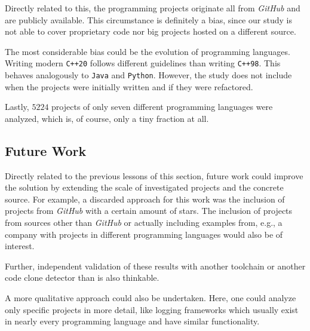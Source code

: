 Directly related to this, the programming projects originate all from \textit{GitHub} and are publicly available. This circumstance is definitely a bias, since our study is not able to cover proprietary code nor big projects hosted on a different source.

The most considerable bias could be the evolution of programming languages. Writing modern \texttt{C++20} follows different guidelines than writing \texttt{C++98}. This behaves analogously to \texttt{Java} and \texttt{Python}. However, the study does not include when the projects were initially written and if they were refactored.

Lastly, $5224$ projects of only seven different programming languages were analyzed, which is, of course, only a tiny fraction at all.

\subsection{Future Work}

Directly related to the previous lessons of this section, future work could improve the solution by extending the scale of investigated projects and the concrete source. For example, a discarded approach for this work was the inclusion of projects from \textit{GitHub} with a certain amount of stars. The inclusion of projects from sources other than \textit{GitHub} or actually including examples from, e.g., a company with projects in different programming languages would also be of interest.

Further, independent validation of these results with another toolchain or another code clone detector than \teamscale{} is also thinkable.

A more qualitative approach could also be undertaken. Here, one could analyze only specific projects in more detail, like logging frameworks which usually exist in nearly every programming language and have similar functionality.
 
